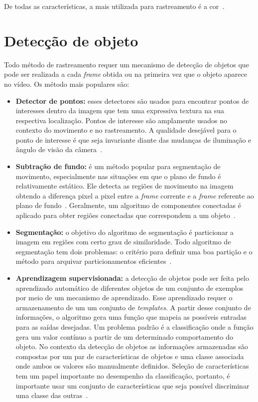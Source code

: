 De todas as características, a mais utilizada para rastreamento é a cor~\cite{yilmaz}.

\section{Detecção de objeto}

	Todo método de rastreamento requer um mecanismo de detecção de objetos que pode ser realizada a cada \textit{frame} obtida ou na primeira vez que o objeto aparece no vídeo. Os método mais populares são:


	\begin{itemize}
		\item \textbf{Detector de pontos:} esses detectores são usados para encontrar pontos de interesses dentro da imagem que tem uma expressiva textura na sua respectiva localização. Pontos de interesse são amplamente usados no contexto do movimento e no rastreamento. A qualidade desejável para o ponto de interesse é que seja invariante diante das mudanças de iluminação e ângulo de visão da câmera~\cite{yilmaz}.
	
		\item \textbf{Subtração de fundo:} é um método popular para segmentação de movimento, especialmente nas situações em que o plano de fundo é relativamente estático. Ele detecta as regiões de movimento na imagem obtendo a diferença pixel a pixel entre a \textit{frame} corrente e a \textit{frame} referente ao plano de fundo~\cite{weiming}. Geralmente, um algoritmo de componentes conectadas é aplicado para obter regiões conectadas que correspondem a um objeto~\cite{yilmaz}.

		\item \textbf{Segmentação:} o objetivo do algoritmo de segmentação é particionar a imagem em regiões com certo grau de similaridade. Todo algoritmo de segmentação tem dois problemas: o critério para definir uma boa partição e o método para arquivar particionamentos eficientes~\cite{yilmaz}.

		\item \textbf{Aprendizagem supervisionada:} a detecção de objetos pode ser feita pelo aprendizado automático de diferentes objetos de um conjunto de exemplos por meio de um mecanismo de aprendizado. Esse aprendizado requer o armazenamento de um um conjunto de \textit{templates}. A partir desse conjunto de informações, o algoritmo gera uma função que mapeia as possíveis entradas para as saídas desejadas. Um problema padrão é a classificação onde a função gera um valor contínuo a partir de um determinado comportamento do objeto. No contexto da detecção de objetos as informações armazenadas são compostas por um par de características de objetos e uma classe associada onde ambos os valores são manualmente definidos. Seleção de características tem um papel importante no desempenho da classificação, portanto, é importante usar um conjunto de características que seja possível discriminar uma classe das outras~\cite{yilmaz}.
	\end{itemize}


